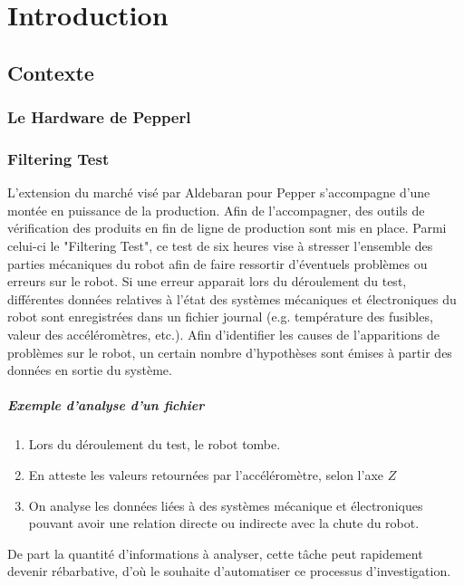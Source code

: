 \chapter{Introduction}
\label{Introduction}
\thispagestyle{fancy}

\section{Contexte}
\label{Introduction:Contexte}

\subsection{Le Hardware de Pepperl}
\label{Introduction:Contexte:Filtering Le Hardware de Pepper }

\subsection{Filtering Test}
\label{Introduction:Contexte:Filtering Test}
L'extension du marché visé par Aldebaran pour Pepper s'accompagne d'une montée en puissance de la production. Afin de l'accompagner, des outils de vérification des produits en fin de ligne de production sont mis en place. Parmi celui-ci le "Filtering Test", ce test de six heures vise à stresser l'ensemble des parties mécaniques du robot afin de faire ressortir d'éventuels problèmes ou erreurs sur le robot. Si une erreur apparait lors du déroulement du test, différentes données relatives à l'état des systèmes mécaniques et électroniques du robot sont enregistrées dans un fichier journal (e.g. température des fusibles, valeur des accéléromètres, etc.). Afin d'identifier les causes de l'apparitions de problèmes sur le robot, un certain nombre d'hypothèses sont émises à partir des données en sortie du système. 

\paragraph{Exemple d'analyse d'un fichier}
\begin{enumerate}
	\item Lors du déroulement du test, le robot tombe.
	\item En atteste les valeurs retournées par l'accéléromètre, selon l'axe $Z$
	\item On analyse les données liées à des systèmes mécanique et électroniques pouvant avoir une relation directe ou indirecte avec la chute du robot.  
\end{enumerate}


De part la quantité d'informations à analyser, cette tâche peut rapidement devenir rébarbative, d'où le souhaite d'automatiser ce processus d'investigation.
